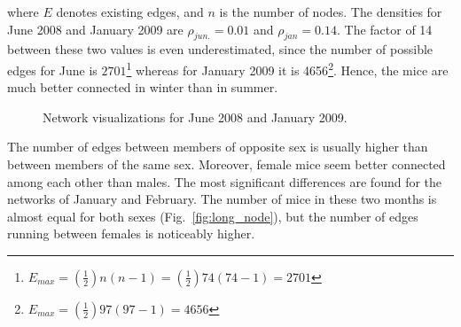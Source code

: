 where $E$ denotes existing edges, and $n$ is the number of nodes. The densities for June 2008 and January 2009 are $\rho_{jun.} = 0.01$ and $\rho_{jan} = 0.14$. The factor of 14 between these two values is even underestimated, since the number of possible edges for June is $2701$\footnote{$E_{max} = (\frac{1}{2})n(n-1) = (\frac{1}{2}) 74(74 -1) = 2701$} whereas for January 2009 it is 4656\footnote{$E_{max} = (\frac{1}{2}) 97(97-1)  = 4656$}. Hence, the mice are much better connected in winter than in summer.  

\begin{figure}[htpb]%
	\centering 
	
	\qquad 			
	\caption[Network visualizations for June 2008 and January 2009]{Network visualizations for June 2008 and January 2009.}
	 \label{fig:june_jan_side}
\end{figure} 

The number of edges between members of opposite sex is usually higher than between members of the same sex. Moreover, female mice seem better connected among each other than males. The most significant differences are found for the networks of January and February. The number of mice in these two months is almost equal for both sexes (Fig.~\ref{fig:long_node}), but the number of edges running between females is noticeably higher. 
 
